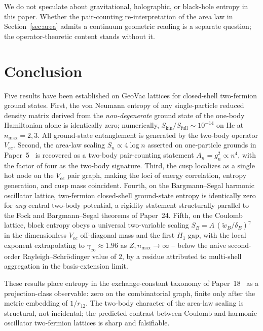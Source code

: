 \documentclass[twocolumn,pra,amsmath,amssymb,superscriptaddress]{revtex4-2}
\begin{document}
\medskip
We do not speculate about gravitational, holographic, or
black-hole entropy in this paper.  Whether the pair-counting
re-interpretation of the area law in Section~\ref{sec:area}
admits a continuum geometric reading is a separate question;
the operator-theoretic content stands without it.

\section{Conclusion}
\label{sec:conclusion}

Five results have been established on GeoVac lattices for
closed-shell two-fermion ground states.  First, the von
Neumann entropy of any single-particle reduced density matrix
derived from the \emph{non-degenerate} ground state of the
one-body Hamiltonian alone is identically zero; numerically,
$S_{\mathrm{kin}}/S_{\mathrm{full}}\sim 10^{-14}$ on He at
$n_{\max}=2,3$.  All ground-state entanglement is generated by
the two-body operator $V_{ee}$.  Second, the area-law scaling
$S_n \propto 4\log n$ asserted on one-particle grounds in
Paper~5~\cite{GeoVac_Paper5} is recovered as a two-body
pair-counting statement $A_n = g_n^{2}\propto n^{4}$, with the
factor of four as the two-body signature.  Third, the cusp
localizes as a single hot node on the $V_{ee}$ pair graph,
making the loci of energy correlation, entropy generation, and
cusp mass coincident.  Fourth, on the Bargmann--Segal harmonic
oscillator lattice, two-fermion closed-shell ground-state
entropy is identically zero for \emph{any} central two-body
potential, a rigidity statement structurally parallel to the
Fock and Bargmann--Segal theorems of Paper~24.  Fifth, on the
Coulomb lattice, block entropy obeys a universal two-variable
scaling
$S_B = A\,(\tilde{w}_B/\delta_B)^{\gamma}$ in the dimensionless
$V_{ee}$ off-diagonal mass and the first $H_1$ gap, with the
local exponent extrapolating to $\gamma_{\infty} \approx 1.96$
as $Z, n_{\max} \to \infty$ -- below the naive second-order
Rayleigh--Schr\"odinger value of $2$, by a residue attributed
to multi-shell aggregation in the basis-extension limit.

These results place entropy in the exchange-constant
taxonomy of Paper~18~\cite{GeoVac_Paper18} as a
projection-class observable: zero on the combinatorial graph,
finite only after the metric embedding of $1/r_{12}$.  The
two-body character of the area-law scaling is structural, not
incidental; the predicted contrast between Coulomb and harmonic
oscillator two-fermion lattices is sharp and falsifiable.
\end{document}
